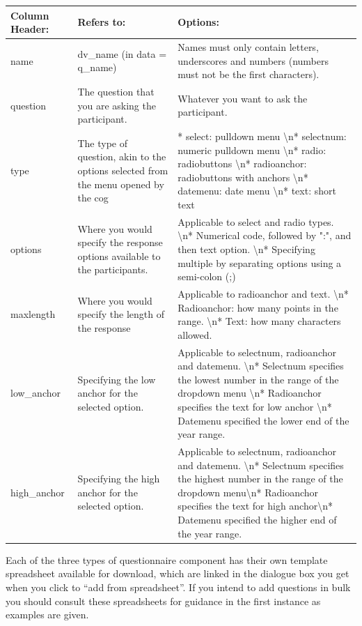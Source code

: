 \documentclass[]{book}
\begin{document}
\begin{tabular}{l|l|l}
\hline
Column Header: & Refers to: & Options:\\
\hline
name & dv\_name (in data = q\_name) & Names must only contain letters, underscores and numbers (numbers must not be the first characters).\\
\hline
question & The question that you are asking the participant. & Whatever you want to ask the participant.\\
\hline
type & The type of question, akin to the options selected from the menu opened by the cog & * select: pulldown menu \textbackslash{}n* selectnum: numeric pulldown menu \textbackslash{}n* radio: radiobuttons \textbackslash{}n* radioanchor: radiobuttons with anchors \textbackslash{}n* datemenu: date menu \textbackslash{}n* text: short text\\
\hline
options & Where you would specify the response options available to the participants. & Applicable to select and radio types. \textbackslash{}n*  Numerical code, followed by ":", and then text option. \textbackslash{}n*  Specifying multiple by separating options using a semi-colon (;)\\
\hline
maxlength & Where you would specify the length of the response & Applicable to radioanchor and text. \textbackslash{}n*  Radioanchor: how many points in the range. \textbackslash{}n*  Text: how many characters allowed.\\
\hline
low\_anchor & Specifying the low anchor for the selected option. & Applicable to selectnum, radioanchor and datemenu. \textbackslash{}n*  Selectnum specifies the lowest number in the range of the dropdown menu \textbackslash{}n*  Radioanchor specifies the text for low anchor \textbackslash{}n*  Datemenu specified the lower end of the year range.\\
\hline
high\_anchor & Specifying the high anchor for the selected option. & Applicable to selectnum, radioanchor and datemenu. \textbackslash{}n*  Selectnum specifies the highest number in the range of the dropdown menu\textbackslash{}n*  Radioanchor specifies the text for high anchor\textbackslash{}n*  Datemenu specified the higher end of the year range.\\
\hline
\end{tabular}

Each of the three types of questionnaire component has their own
template spreadsheet available for download, which are linked in the
dialogue box you get when you click to ``add from spreadsheet''. If you
intend to add questions in bulk you should consult these spreadsheets
for guidance in the first instance as examples are given.
\end{document}
